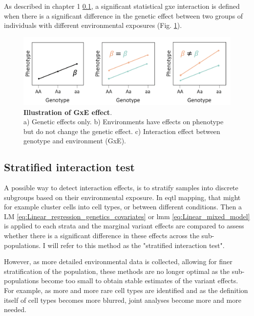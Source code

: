 As described in chapter 1 \ref{}, a significant statistical \gls{gxe} interaction is defined when there is a significant difference in the genetic effect between two groups of individuals with different environmental exposures (Fig. \ref{fig:gxe}).

\begin{figure}[h]
\centering
\includegraphics[width=15cm]{Chapter1/Fig/GxE.png}
\caption[\textbf{Illustration of GxE}]{\textbf{Illustration of GxE effect}.\\
a) Genetic effects only. b) Environments have effects on phenotype but do not change the genetic effect. c) Interaction effect between genotype and environment (GxE).}
\label{fig:gxe}
\end{figure}

\subsection{Stratified interaction test}

A possible way to detect interaction effects, is to stratify samples into discrete subgroups based on their environmental exposure.
In e\gls{qtl} mapping, that might for example cluster cells into cell types, or between different conditions.
Then a LM \eqref{eq:Linear_regression_genetics_covariates} or \gls{lmm} \eqref{eq:Linear_mixed_model} is applied to each strata and the marginal variant effects are compared to assess whether there is a significant difference in these effects across the sub-populations.
I will refer to this method as the "stratified interaction test".

However, as more detailed environmental data is collected, allowing for finer stratification of the population, these methods are no longer optimal as the sub-populations become too small to obtain stable estimates of the variant effects.
For example, as more and more rare cell types are identified and as the definition itself of cell types becomes more blurred, joint analyses become more and more needed.



